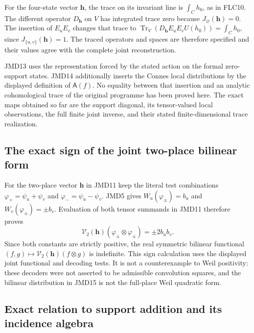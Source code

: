 \documentclass[11pt]{article}
\begin{document}
For the four-state vector $\mathbf h$, the trace on its invariant
line is $\int_Ch_0$, as in FLC10.
The different operator $D_{\mathbf h}$ on $V$ has integrated trace
zero because $J_\varnothing(\mathbf h)=0$.
The insertion of $E_uE_v$ changes that trace to
$\operatorname{Tr}_V(D_{\mathbf h}E_uE_vU(h_0))=\int_Ch_0$,
since $J_{\{u,v\}}(\mathbf h)=1$.
The traced operators and spaces are therefore specified and their
values agree with the complete joint reconstruction.

JMD13 uses the representation forced by the stated action on the
formal zero-support states. JMD14 additionally inserts the Connes
local distributions by the displayed definition of $\mathsf A(f)$.
No equality between that insertion and an analytic cohomological
trace of the original programme has been proved here.
The exact maps obtained so far are the support diagonal, its
tensor-valued local observations, the full finite joint inverse,
and their stated finite-dimensional trace realization.

\subsection{The exact sign of the joint two-place bilinear form}

For the two-place vector $\mathbf h$ in JMD11 keep the literal
test combinations $\varphi_+=\psi_u+\psi_v$ and
$\varphi_-=\psi_u-\psi_v$.
JMD5 gives $W_u(\varphi_\pm)=b_u$ and
$W_v(\varphi_\pm)=\pm b_v$.
Evaluation of both tensor summands in JMD11 therefore proves
\[
\boxed{
\mathcal V_2(\mathbf h)(\varphi_\pm\otimes\varphi_\pm)
=\pm2b_ub_v.}
\tag{JMD15}
\]
Since both constants are strictly positive, the real symmetric
bilinear functional $(f,g)\mapsto\mathcal V_2(\mathbf h)(f\otimes g)$
is indefinite. This sign calculation uses the displayed joint
functional and decoding tests. It is not a counterexample to Weil
positivity: these decoders were not asserted to be admissible
convolution squares, and the bilinear distribution in JMD15 is not
the full-place Weil quadratic form.

\subsection{Exact relation to support addition and its incidence algebra}
\end{document}
